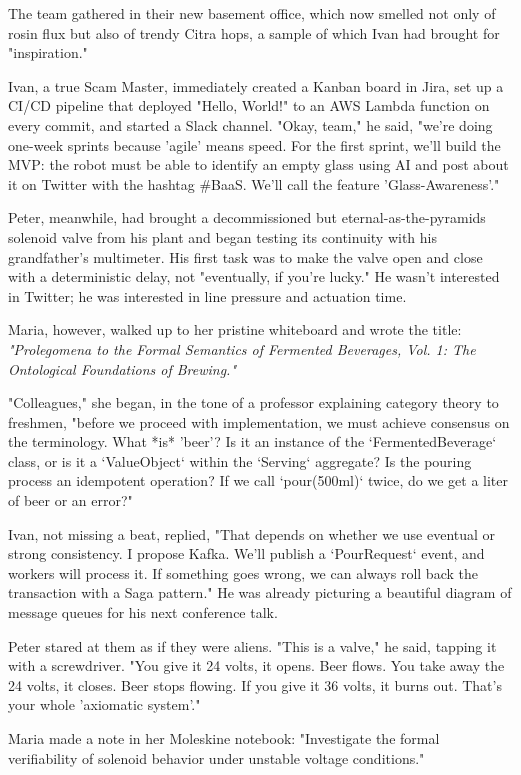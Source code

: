 The team gathered in their new basement office, which now smelled not only of rosin flux but also of trendy Citra hops, a sample of which Ivan had brought for "inspiration."

Ivan, a true Scam Master, immediately created a Kanban board in Jira, set up a CI/CD pipeline that deployed "Hello, World!" to an AWS Lambda function on every commit, and started a Slack channel. "Okay, team," he said, "we're doing one-week sprints because 'agile' means speed. For the first sprint, we'll build the MVP: the robot must be able to identify an empty glass using AI and post about it on Twitter with the hashtag \#BaaS. We'll call the feature 'Glass-Awareness'."

Peter, meanwhile, had brought a decommissioned but eternal-as-the-pyramids solenoid valve from his plant and began testing its continuity with his grandfather's multimeter. His first task was to make the valve open and close with a deterministic delay, not "eventually, if you're lucky." He wasn't interested in Twitter; he was interested in line pressure and actuation time.

Maria, however, walked up to her pristine whiteboard and wrote the title: \textit{"Prolegomena to the Formal Semantics of Fermented Beverages, Vol. 1: The Ontological Foundations of Brewing."}

"Colleagues," she began, in the tone of a professor explaining category theory to freshmen, "before we proceed with implementation, we must achieve consensus on the terminology. What *is* 'beer'? Is it an instance of the `FermentedBeverage` class, or is it a `ValueObject` within the `Serving` aggregate? Is the pouring process an idempotent operation? If we call `pour(500ml)` twice, do we get a liter of beer or an error?"

Ivan, not missing a beat, replied, "That depends on whether we use eventual or strong consistency. I propose Kafka. We'll publish a `PourRequest` event, and workers will process it. If something goes wrong, we can always roll back the transaction with a Saga pattern." He was already picturing a beautiful diagram of message queues for his next conference talk.

Peter stared at them as if they were aliens. "This is a valve," he said, tapping it with a screwdriver. "You give it 24 volts, it opens. Beer flows. You take away the 24 volts, it closes. Beer stops flowing. If you give it 36 volts, it burns out. That's your whole 'axiomatic system'."

Maria made a note in her Moleskine notebook: "Investigate the formal verifiability of solenoid behavior under unstable voltage conditions."

